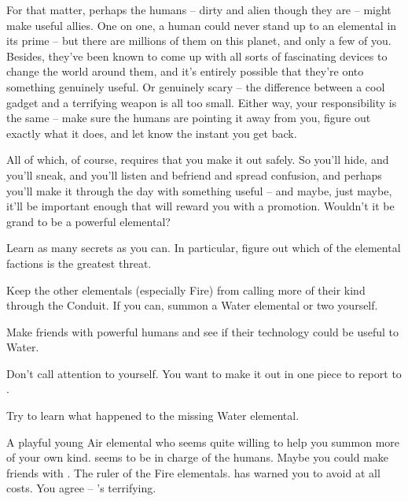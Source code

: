 \documentclass[char]{elementals}
\begin{document}
For that matter, perhaps the humans -- dirty and alien though they are -- might make useful allies. One on one, a human could never stand up to an elemental in its prime -- but there are millions of them on this planet, and only a few of you. Besides, they've been known to come up with all sorts of fascinating devices to change the world around them, and it's entirely possible that they're onto something genuinely useful. Or genuinely scary -- the difference between a cool gadget and a terrifying weapon is all too small. Either way, your responsibility is the same -- make sure the humans are pointing it away from you, figure out exactly what it does, and let \cWaterQueen{} know the instant you get back.

All of which, of course, requires that you make it out safely. So you'll hide, and you'll sneak, and you'll listen and befriend and spread confusion, and perhaps you'll make it through the day with something useful -- and maybe, just maybe, it'll be important enough that \cWaterQueen{} will reward you with a promotion. Wouldn't it be grand to be a powerful elemental?

\begin{itemz}[Goals]
	\item  Learn as many secrets as you can. In particular, figure out which of the elemental factions is the greatest threat.
	\item  Keep the other elementals (especially Fire) from calling more of their kind through the Conduit. If you can, summon a Water elemental or two yourself.
	\item  Make friends with powerful humans and see if their technology could be useful to Water.
	\item  Don't call attention to yourself. You want to make it out in one piece to report to \cWaterQueen{}.
	\item  Try to learn what happened to the missing Water elemental.
\end{itemz}

\begin{contacts}
	\contact{\cMiniAir{\intro}} A playful young Air elemental who seems quite willing to help you summon more of your own kind.
	\contact{\cLeader{\intro}} \cLeader{\They} seems to be in charge of the humans. Maybe you could make friends with \cLeader{\them}.
  \contact{\cQueen{\intro}} The ruler of the Fire elementals. \cWaterQueen{} has warned you to avoid \cQueen{\them} at all costs. You agree -- \cQueen{\they}'s terrifying.
\end{contacts} 
\end{document}
